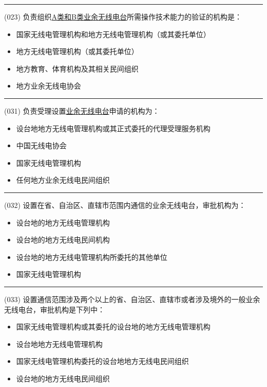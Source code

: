 \documentclass[twocolumn,hyperref,UTF8]{ctexart}  %
\begin{document}
\noindent\rule{0.5\textwidth}{1pt}
\heiti (023) 负责{\color{cyan}组织}\underline{A类和B类业余无线电台}所需{\color{cyan}操作技术能力的验证}的机构是： \songti {\color{gray} [LK0020] }
\begin{itemize}
	\item  国家无线电管理机构{\color{LimeGreen}和地方}无线电管理机构（或其委托单位）
	\item  地方无线电管理机构（或其委托单位）
	\item  地方教育、体育机构及其相关民间组织
	\item  地方业余无线电{\color{red}协会}
\end{itemize}


\noindent\rule{0.5\textwidth}{1pt}
\heiti (031) 负责{\color{cyan}受理设置}\underline{业余无线电台}{\color{cyan}申请}的机构为： \songti {\color{gray} [LK0030] }
\begin{itemize}
	\item  设台地地方无线电管理机构或其正式委托的代理受理服务机构
	\item  中国无线电协会
	\item  国家无线电管理机构
	\item  任何地方业余无线电民间组织
\end{itemize}


\noindent\rule{0.5\textwidth}{1pt}
\heiti (032) 设置在省、自治区、直辖市{\color{cyan}范围内}通信的业余无线电台，{\color{cyan}审批}机构为： \songti {\color{gray} [LK0031] }
\begin{itemize}
	\item  设台地的地方无线电管理机构
	\item  设台地的地方无线电民间机构
	\item  设台地的地方无线电管理机构所委托的其他单位
	\item  国家无线电管理机构
\end{itemize}


\noindent\rule{0.5\textwidth}{1pt}
\heiti (033) 设置通信范围{\color{cyan}涉及两个以上}的省、自治区、直辖市{\color{cyan}或者涉及境外}的一般业余无线电台，{\color{cyan}审批}机构是下列中： \songti {\color{gray} [LK0032] }
\begin{itemize}
	\item  国家无线电管理机构{\color{LimeGreen}或其}委托的设台地的地方无线电管理机构
	\item  设台地地方无线电管理机构
	\item  国家无线电管理机构委托的设台地地方无线电{\color{red}民间组织}
	\item  设台地的地方无线电民间组织
\end{itemize}
\end{document}
